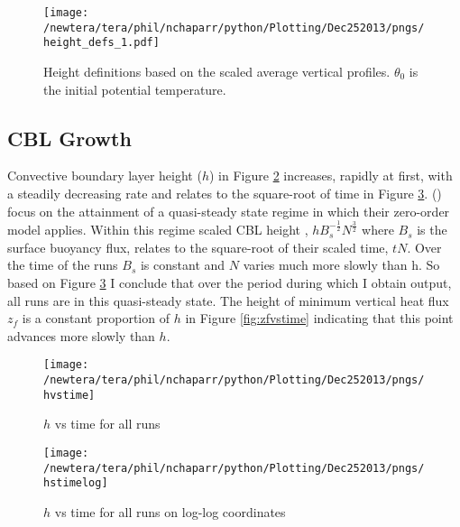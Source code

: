 \begin{figure}[htbp]
    \centering
    \texttt{[image: /newtera/tera/phil/nchaparr/python/Plotting/Dec252013/pngs/height\_defs\_1.pdf]}
    \caption[Height definitions]{Height definitions based on the scaled average vertical profiles. $\theta_{0}$ is the initial potential temperature.}
    \label{fig:hdefs1}   %
\end{figure}

\subsection{\acs{CBL} Growth}

Convective boundary layer height ($h$) in Figure \ref{fig:hvstime} increases, rapidly at first, with a steadily decreasing rate and relates to the square-root of time in Figure \ref{fig:loghvstime}.  \citeauthor{FedConzMir04} (\citeyear{FedConzMir04})
focus on the attainment of a quasi-steady state regime in which their zero-order model applies.  Within this regime scaled \acs{CBL} height , $hB_{s}^{-\frac{1}{2}}N^{\frac{3}{2}}$ where $B_{s}$ is the surface buoyancy flux, relates to the square-root of their scaled time, $tN$. Over the time of the runs $B_{s}$ is constant and $N$ varies much more slowly than h.  So based on Figure \ref{fig:loghvstime} I conclude that over the period during which I obtain output, all runs are in this quasi-steady state. The height of minimum vertical heat flux $z_{f}$ is a constant proportion of $h$ in Figure \ref{fig:zfvstime} indicating that this point advances more slowly than $h$.\\
  
\begin{figure}[htbp]
    \centering
    \texttt{[image: /newtera/tera/phil/nchaparr/python/Plotting/Dec252013/pngs/hvstime]}
    \caption{$h$ vs time for all runs}
    \label{fig:hvstime}   %
\end{figure}

\begin{figure}[htbp]
    \centering
    \texttt{[image: /newtera/tera/phil/nchaparr/python/Plotting/Dec252013/pngs/hstimelog]}
    \caption{$h$ vs time for all runs on log-log coordinates}
    \label{fig:loghvstime}   %
\end{figure}

